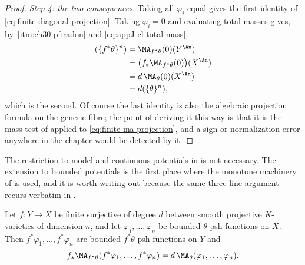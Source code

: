 \begin{proof}
\emph{Step 4: the two consequences.}  Taking all \(\varphi_i\) equal gives
the first identity of \eqref{eq:finite-diagonal-projection}.  Taking
\(\varphi_i=0\) and evaluating total masses gives, by
\,\cref{itm:ch30-pf:radon} and
\eqref{eq:appJ-cl-total-mass},
\[
 \begin{aligned}
 (\{f^*\theta\}^n)
 &=\MA_{f^*\theta}(0)(Y^{\An})\\
 &=\bigl(f_*\MA_{f^*\theta}(0)\bigr)(X^{\An})\\
 &=d\,\MA_\theta(0)(X^{\An})\\
 &=d(\{\theta\}^n),
 \end{aligned}
\]
which is the second.  Of course the last identity is also the algebraic
projection formula on the generic fibre; the point of deriving it this way
is that it is the mass test of  applied to
\eqref{eq:finite-ma-projection}, and a sign or normalization error anywhere
in the chapter would be detected by it.
\end{proof}

The restriction to model and continuous potentials in
 is not necessary.  The extension to bounded
potentials is the first place where the monotone machinery of
 is used, and it is worth writing out because the same
three-line argument recurs verbatim in
.

\begin{theorem}
\label{thm:ch30-finite-bounded-projection}
Let \(f:Y\to X\) be finite surjective of degree \(d\) between smooth
projective \(K\)-varieties of dimension \(n\), and let
\(\varphi_1,\ldots,\varphi_n\) be bounded \(\theta\)-psh functions on
\(X\).  Then \(f^*\varphi_1,\ldots,f^*\varphi_n\) are bounded
\(f^*\theta\)-psh functions on \(Y\) and
\begin{equation}
\label{eq:ch30-bounded-projection}
 f_*\MA_{f^*\theta}(f^*\varphi_1,\ldots,f^*\varphi_n)
 =d\,\MA_\theta(\varphi_1,\ldots,\varphi_n).
\end{equation}
\end{theorem}

